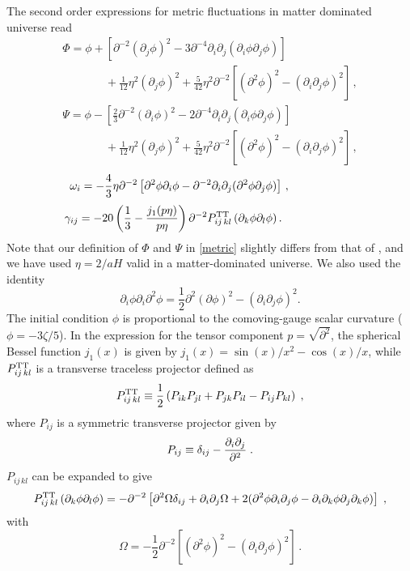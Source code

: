 \documentclass[12pt]{article}
\numberwithin{equation}{section}
\def\bea{\begin{eqnarray}}
\def\eea{\end{eqnarray}}
\def\be{\begin{equation}}
\def\ee{\end{equation}}
\def\d{\partial}
\begin{document}
{The second order expressions for metric fluctuations in matter dominated universe read \cite{Creminelli_action}
\bea
 \Phi =  \phi+
  \left[\d^{-2}(\d_j\phi)^2
    -3\d^{-4}\d_i\d_j(\d_i\phi\d_j\phi) \right]~~~~~~~~~~~~~~~~~~~~ \label{Phi} \\
~~~~~~~~~~~~~~~~~   +\frac{1}{12}\eta^2(\d_j\phi)^2+\frac{5}{42}\eta^2\d^{-2}
\left[(\d^2\phi)^2-(\d_i\d_j\phi)^2\right] \, , \nonumber
\eea
\bea
  \Psi = \phi -\left[\frac{2}{3} \d^{-2}(\d_i\phi)^2
    - 2 \d^{-4} \d_i\d_j(\d_i\phi\d_j\phi) \right] \label{Psi}~~~~~~~~~~~~~~~~~~ \\
~~~~~~~~~~~~~~~~~   +\frac{1}{12}\eta^2(\d_j\phi)^2+\frac{5}{42}\eta^2\d^{-2}
\left[(\d^2\phi)^2-(\d_i\d_j\phi)^2\right] \, , \nonumber
\eea
\be
  \omega_{i} = - \frac{4}{3}\eta \d^{-2} \left[\d^2 \phi \d_i \phi
    - \d^{-2} \d_i\d_j
    (\d^2\phi \d_j\phi) \right] \, ,~~~~~~~~~~~~~~~~~ \label{omega} \\
\ee
\be
  {\gamma}_{ij} =  - 20
  \left( \frac{1}{3} - \frac{j_1(p\eta)}{p \eta} \right)
  \d^{-2} P_{ij \, kl}^{\rm TT}
  \left( \d_k\phi\d_l\phi \right). ~~~~~~~~~~~~~~~~~~~\label{gamma} \, 
\ee
Note that our definition of $\Phi$ and $\Psi$ in \eqref{metric} slightly differs from that of \cite{Creminelli_action}, and we have used $\eta=2/aH$ valid in a matter-dominated universe. We also used the identity
\be
\d_i \phi \d_i \d^2\phi = \frac{1}{2}\d^2(\d\phi)^2 -(\d_i\d_j\phi)^2.
\ee
The initial condition $\phi$ is proportional to the comoving-gauge scalar curvature ($\phi=-3\zeta/5$). In the expression for the tensor component $p=\sqrt{\d^2}$, the spherical Bessel function $j_1(x)$ is given by $j_1(x)=\sin(x)/x^2-\cos(x)/x$, while $P_{ij \, kl}^{\rm TT}$ is a transverse traceless projector defined as
\begin{equation}
\label{projector}
P_{ij \, kl}^{\rm TT}\equiv \frac12 \left(P_{ik} P_{jl} + P_{jk} P_{il}- P_{ij} P_{kl}\right) \;,
\end{equation}
where $P_{ij}$ is a symmetric transverse projector given by
\begin{equation}
P_{ij}\equiv \delta_{ij} -{\partial_i\partial_j\over \partial^2} \;.
\end{equation}
$P_{ij \, kl}$ can be expanded to give
\begin{equation}\label{expansion2}
  P_{ij \, kl}^{\rm TT} \left( \d_k\phi\d_l\phi \right) = - \d^{-2}
  \left[ \d^2 \Omega \delta_{ij} + \d_i \d_j \Omega +2 (\d^2 \phi
    \d_i \d_j \phi - \d_i \d_k \phi \d_j \d_k \phi) \right]\;,
\end{equation}
with
\begin{equation}
  \Omega = - \frac12 \d^{-2} \left[ (\d^2 \phi)^2 -(\d_i\d_j\phi)^2
  \right] \, .
\end{equation}

}
\end{document}

